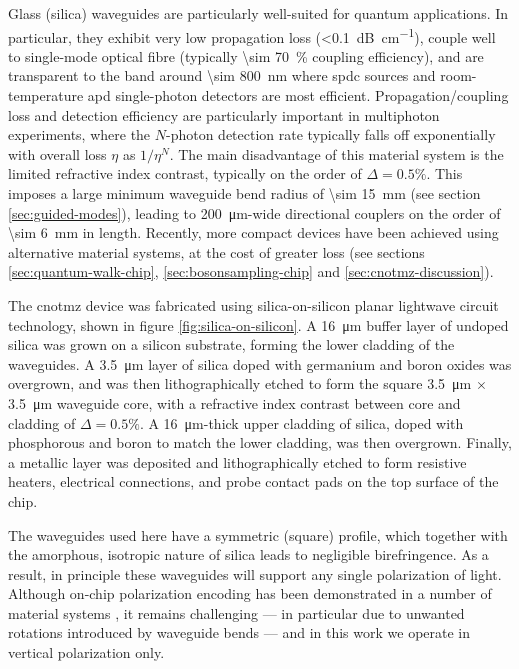 Glass (silica) waveguides are particularly well-suited for quantum applications. 
In particular, they exhibit very low propagation loss (\SI{<0.1}{\dB \per \centi \metre}), couple well to single-mode optical fibre (typically \SI{\sim 70}{\percent} coupling efficiency), and are transparent to the band around \SI{\sim 800}{\nano \metre} where \gls{spdc} sources and room-temperature \gls{apd} single-photon detectors are most efficient.  Propagation/coupling loss and detection efficiency are particularly important in multiphoton experiments, where the $N$-photon detection rate typically falls off exponentially with overall loss $\eta$ as $1/\eta^N$. The main disadvantage of this material system is the limited refractive index contrast, typically on the order of $\Delta=0.5\%$. This imposes a large minimum waveguide bend radius of \SI{\sim 15}{\milli \metre} (see section \ref{sec:guided-modes}), leading to \SI{200}{\micro\metre}-wide directional couplers on the order of \SI{\sim 6}{\milli \metre} in length. Recently, more compact devices have been achieved using alternative material systems, at the cost of greater loss (see sections \ref{sec:quantum-walk-chip}, \ref{sec:bosonsampling-chip} and \ref{sec:cnotmz-discussion}).

The \acrshort{cnotmz} device was fabricated using silica-on-silicon planar lightwave circuit technology, shown in figure \ref{fig:silica-on-silicon}.  
A \SI{16}{\micro \metre} buffer layer of undoped silica was grown on a silicon substrate, forming the lower cladding of the waveguides. A \SI{3.5}{\micro \metre} layer of silica doped with germanium and boron oxides was overgrown, and was then lithographically etched to form the square \SI{3.5}{\micro \metre} $\times$ \SI{3.5}{\micro \metre} waveguide core, with a refractive index contrast between core and cladding of $\Delta=0.5\%$. A \SI{16}{\micro \metre}-thick upper cladding of silica, doped with phosphorous and boron to match the lower cladding, was then overgrown. Finally, a metallic layer was deposited and lithographically etched to form resistive heaters, electrical connections, and probe contact pads on the top surface of the chip. 

The waveguides used here have a symmetric (square) profile, which together with the amorphous, isotropic nature of silica leads to negligible birefringence. As a result, in principle these waveguides will support any single polarization of light. Although on-chip polarization encoding has been demonstrated in a number of material systems \cite{Bonneau2012b, Dai2012, Crespi2011}, it remains challenging --- in particular due to unwanted rotations introduced by waveguide bends --- and in this work we operate in vertical polarization only.

